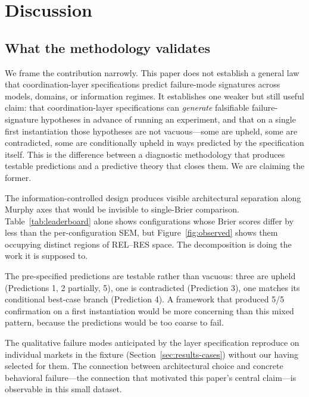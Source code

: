 \documentclass[11pt]{article}
\begin{document}
\section{Discussion}
\label{sec:discussion}

\subsection{What the methodology validates}
\label{sec:discussion-validates}

We frame the contribution narrowly. This paper does not establish a general law that coordination-layer specifications predict failure-mode signatures across models, domains, or information regimes. It establishes one weaker but still useful claim: that coordination-layer specifications can \emph{generate} falsifiable failure-signature hypotheses in advance of running an experiment, and that on a single first instantiation those hypotheses are not vacuous---some are upheld, some are contradicted, some are conditionally upheld in ways predicted by the specification itself. This is the difference between a diagnostic methodology that produces testable predictions and a predictive theory that closes them. We are claiming the former.

The information-controlled design produces visible architectural separation along Murphy axes that would be invisible to single-Brier comparison. Table~\ref{tab:leaderboard} alone shows configurations whose Brier scores differ by less than the per-configuration SEM, but Figure~\ref{fig:observed} shows them occupying distinct regions of REL--RES space. The decomposition is doing the work it is supposed to.

The pre-specified predictions are testable rather than vacuous: three are upheld (Predictions 1, 2 partially, 5), one is contradicted (Prediction 3), one matches its conditional best-case branch (Prediction 4). A framework that produced 5/5 confirmation on a first instantiation would be more concerning than this mixed pattern, because the predictions would be too coarse to fail.

The qualitative failure modes anticipated by the layer specification reproduce on individual markets in the fixture (Section~\ref{sec:results-cases}) without our having selected for them. The connection between architectural choice and concrete behavioral failure---the connection that motivated this paper's central claim---is observable in this small dataset.
\end{document}
